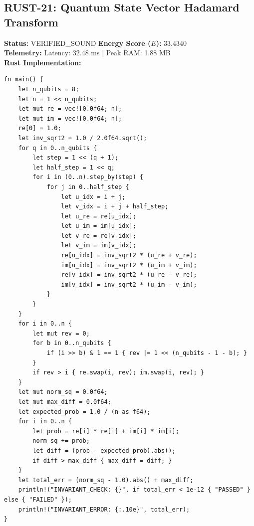 \documentclass[11pt, a4paper]{article}
\begin{document}
\subsection{RUST-21: Quantum State Vector Hadamard Transform}
\textbf{Status:} VERIFIED\_SOUND \hfill \textbf{Energy Score ($E$):} 33.4340\\
\textbf{Telemetry:} Latency: 32.48 ms $|$ Peak RAM: 1.88 MB\\
\textbf{Rust Implementation:}
\begin{verbatim}
fn main() {
    let n_qubits = 8;
    let n = 1 << n_qubits;
    let mut re = vec![0.0f64; n];
    let mut im = vec![0.0f64; n];
    re[0] = 1.0;
    let inv_sqrt2 = 1.0 / 2.0f64.sqrt();
    for q in 0..n_qubits {
        let step = 1 << (q + 1);
        let half_step = 1 << q;
        for i in (0..n).step_by(step) {
            for j in 0..half_step {
                let u_idx = i + j;
                let v_idx = i + j + half_step;
                let u_re = re[u_idx];
                let u_im = im[u_idx];
                let v_re = re[v_idx];
                let v_im = im[v_idx];
                re[u_idx] = inv_sqrt2 * (u_re + v_re);
                im[u_idx] = inv_sqrt2 * (u_im + v_im);
                re[v_idx] = inv_sqrt2 * (u_re - v_re);
                im[v_idx] = inv_sqrt2 * (u_im - v_im);
            }
        }
    }
    for i in 0..n {
        let mut rev = 0;
        for b in 0..n_qubits {
            if (i >> b) & 1 == 1 { rev |= 1 << (n_qubits - 1 - b); }
        }
        if rev > i { re.swap(i, rev); im.swap(i, rev); }
    }
    let mut norm_sq = 0.0f64;
    let mut max_diff = 0.0f64;
    let expected_prob = 1.0 / (n as f64);
    for i in 0..n {
        let prob = re[i] * re[i] + im[i] * im[i];
        norm_sq += prob;
        let diff = (prob - expected_prob).abs();
        if diff > max_diff { max_diff = diff; }
    }
    let total_err = (norm_sq - 1.0).abs() + max_diff;
    println!("INVARIANT_CHECK: {}", if total_err < 1e-12 { "PASSED" } else { "FAILED" });
    println!("INVARIANT_ERROR: {:.10e}", total_err);
}
\end{verbatim}
\end{document}
